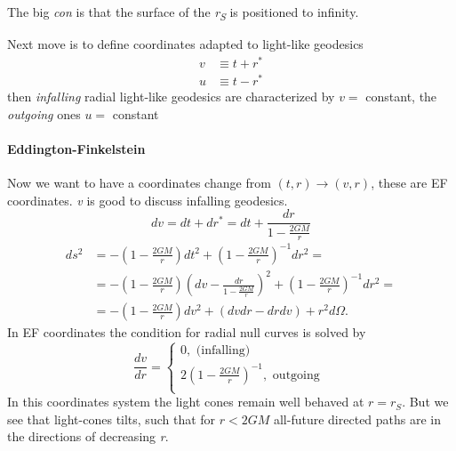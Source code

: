 \bigskip
The big \emph{con } is that the surface of the \emph{r\textsubscript{S}} is positioned to infinity.\par
Next move is to define coordinates adapted to light-like geodesics
\begin{align}
	v & \equiv t+ r^{*}\\
	u & \equiv t - r^{*} 
\end{align}
then \emph{infalling} radial light-like geodesics are characterized by $v =$ constant, the \emph{outgoing} ones $u=$ constant


\paragraph{Eddington-Finkelstein}
Now we want to have a coordinates change from $\left( t,r \right) \to \left( v,r \right)$, these are EF coordinates. \emph{v} is good to discuss infalling geodesics.
\[
dv = dt + dr^{*} = dt + \frac{dr}{1- \frac{2GM}{r}}
\]
\begin{align}
	ds^{2} &= - \left( 1 - \frac{2GM}{r} \right)dt^{2} + \left( 1- \frac{2GM}{r} \right)^{-1}dr^{2} = \\
	       & = - \left( 1- \frac{2GM}{r} \right) \left( dv - \frac{dr}{1 - \frac{2GM}{r}} \right)^{2} + \left( 1 - \frac{2GM}{r} \right)^{-1} dr^{2} = \\
	       & = - \left( 1 - \frac{2GM}{r} \right)dv^{2} + \left( dvdr-drdv \right) + r^{2}d\Omega .
\end{align}
In EF coordinates the condition for radial null curves is solved by
\begin{equation}
\frac{d v}{d r} = \begin{cases}
0,   \text{ (infalling) }\\
2 \left( 1 - \frac{2GM}{r} \right)^{-1} , \text{ outgoing }\\
\end{cases}
\end{equation}
In this coordinates system the light cones remain well behaved at $r=r_{S}$. But we see that light-cones tilts, such that for $r<2GM$ all-future directed paths are in the directions of decreasing \emph{r}.\par
\bigskip

